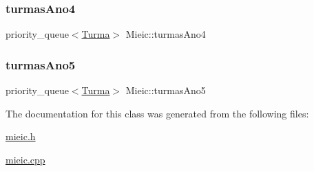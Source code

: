 \subsubsection{\texorpdfstring{turmas\+Ano4}{turmasAno4}}
{\footnotesize\ttfamily priority\+\_\+queue$<$\hyperlink{class_turma}{Turma}$>$ Mieic\+::turmas\+Ano4\hspace{0.3cm}{\ttfamily [private]}}

\hypertarget{class_mieic_afb0cd6587411458b5e281b1862c86b69}{}\label{class_mieic_afb0cd6587411458b5e281b1862c86b69} 
\subsubsection{\texorpdfstring{turmas\+Ano5}{turmasAno5}}
{\footnotesize\ttfamily priority\+\_\+queue$<$\hyperlink{class_turma}{Turma}$>$ Mieic\+::turmas\+Ano5\hspace{0.3cm}{\ttfamily [private]}}



The documentation for this class was generated from the following files\+:\begin{DoxyCompactItemize}
\item 
\hyperlink{mieic_8h}{mieic.\+h}\item 
\hyperlink{mieic_8cpp}{mieic.\+cpp}\end{DoxyCompactItemize}
